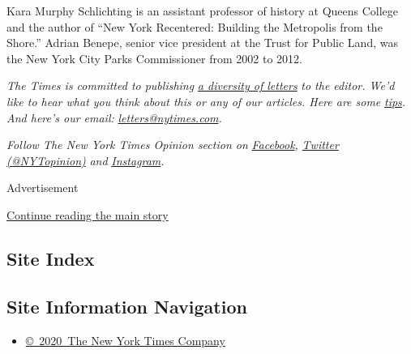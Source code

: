 Kara Murphy Schlichting is an assistant professor of history at Queens
College and the author of ``New York Recentered: Building the Metropolis
from the Shore.'' Adrian Benepe, senior vice president at the Trust for
Public Land, was the New York City Parks Commissioner from 2002 to 2012.

\emph{The Times is committed to publishing}
\href{https://www.nytimes.com/2019/01/31/opinion/letters/letters-to-editor-new-york-times-women.html}{\emph{a
diversity of letters}} \emph{to the editor. We'd like to hear what you
think about this or any of our articles. Here are some}
\href{https://help.nytimes.com/hc/en-us/articles/115014925288-How-to-submit-a-letter-to-the-editor}{\emph{tips}}\emph{.
And here's our email:}
\href{mailto:letters@nytimes.com}{\emph{letters@nytimes.com}}\emph{.}

\emph{Follow The New York Times Opinion section on}
\href{https://www.facebook.com/nytopinion}{\emph{Facebook}}\emph{,}
\href{http://twitter.com/NYTOpinion}{\emph{Twitter (@NYTopinion)}}
\emph{and}
\href{https://www.instagram.com/nytopinion/}{\emph{Instagram}}\emph{.}

Advertisement

\protect\hyperlink{after-bottom}{Continue reading the main story}

\hypertarget{site-index}{%
\subsection{Site Index}\label{site-index}}

\hypertarget{site-information-navigation}{%
\subsection{Site Information
Navigation}\label{site-information-navigation}}

\begin{itemize}
\tightlist
\item
  \href{https://help.nytimes.com/hc/en-us/articles/115014792127-Copyright-notice}{©~2020~The
  New York Times Company}
\end{itemize}

